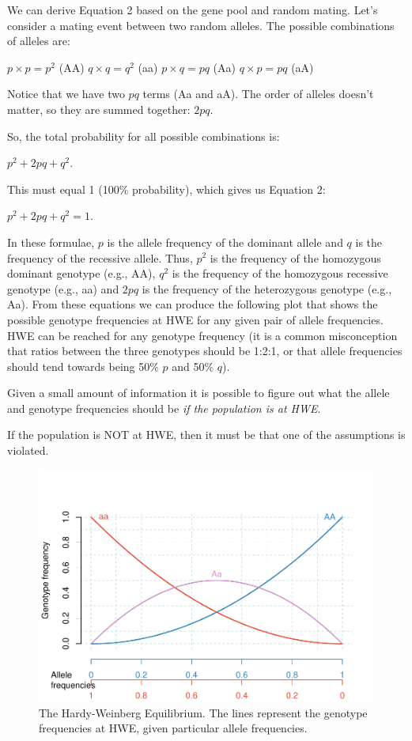 \documentclass[
  a4paper]{book}
\begin{document}
We can derive Equation 2 based on the gene pool and random mating. Let's consider a mating event between two random alleles. The possible combinations of alleles are:

\(p \times p = p^2\) (AA)
\(q \times q = q^2\) (aa)
\(p \times q = pq\) (Aa)
\(q \times p = pq\) (aA)

Notice that we have two \(pq\) terms (Aa and aA). The order of alleles doesn't matter, so they are summed together: \(2pq\).

So, the total probability for all possible combinations is:

\(p^2 + 2pq + q^2\).

This must equal 1 (100\% probability), which gives us Equation 2:

\(p^2 + 2pq + q^2 = 1\).

In these formulae, \(p\) is the allele frequency of the dominant allele and \(q\) is the frequency of the recessive allele. Thus, \(p^2\) is the frequency of the homozygous dominant genotype (e.g., AA), \(q^2\) is the frequency of the homozygous recessive genotype (e.g., aa) and \(2pq\) is the frequency of the heterozygous genotype (e.g., Aa). From these equations we can produce the following plot that shows the possible genotype frequencies at HWE for any given pair of allele frequencies. HWE can be reached for any genotype frequency (it is a common misconception that ratios between the three genotypes should be 1:2:1, or that allele frequencies should tend towards being 50\% \(p\) and 50\% \(q\)).

Given a small amount of information it is possible to figure out what the allele and genotype frequencies should be \emph{if the population is at HWE}.

If the population is NOT at HWE, then it must be that one of the assumptions is violated.

\begin{figure}
\centering
\includegraphics{BB512_files/figure-latex/hardyweinberg-1.pdf}
\caption{\label{fig:hardyweinberg}The Hardy-Weinberg Equilibrium. The lines represent the genotype frequencies at HWE, given particular allele frequencies.}
\end{figure}
\end{document}
